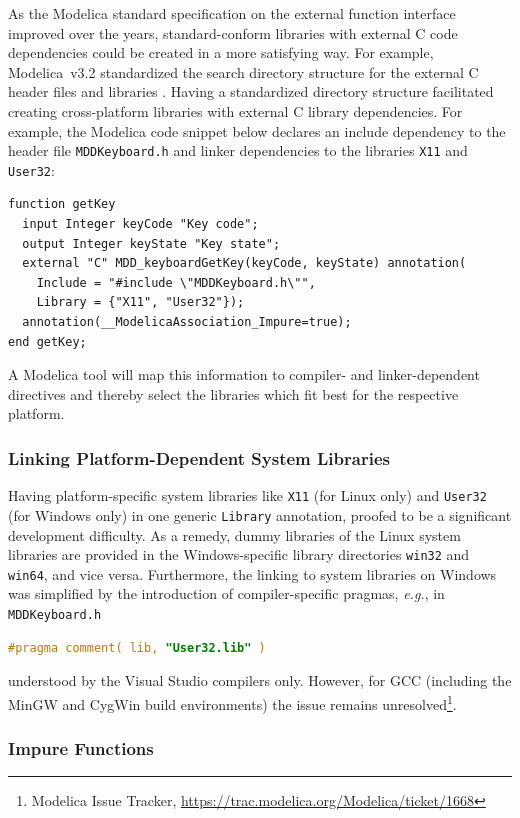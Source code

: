 \documentclass{resources/modelica}
\newcommand{\modelica}[1]{\lstinline[language=modelica]|#1|}
\begin{document}
As the Modelica standard specification on the external function interface improved over the years,
standard-conform libraries with external C code dependencies could
be created in a more satisfying way. For example, Modelica~v3.2
standardized the search directory structure for the external C header files and
libraries \citep[p.\@~153]{ModelicaAssociation2010}.
Having a standardized directory structure facilitated creating cross-platform libraries with external C library
dependencies. For example, the Modelica code snippet below declares an
include dependency to the header file \modelica{MDDKeyboard.h} and linker dependencies to the libraries
\modelica{X11} and \modelica{User32}:
\begin{lstlisting}[language=modelica]
function getKey
  input Integer keyCode "Key code";
  output Integer keyState "Key state";
  external "C" MDD_keyboardGetKey(keyCode, keyState) annotation(
    Include = "#include \"MDDKeyboard.h\"",
    Library = {"X11", "User32"});
  annotation(__ModelicaAssociation_Impure=true);
end getKey;
\end{lstlisting}
A Modelica tool will map this information to compiler- and linker-dependent
directives and thereby select the libraries which fit best for the respective
platform.

\subsubsection{Linking Platform-Dependent System Libraries}

Having platform-specific system libraries like \modelica{X11} (for Linux only) and \modelica{User32} (for Windows only) in one generic \modelica{Library} annotation, proofed to be a significant development difficulty. As a remedy, dummy libraries of the Linux system libraries are provided in the Windows-specific library directories \modelica{win32} and \modelica{win64}, and vice versa. Furthermore, the linking to system libraries on Windows was simplified by the introduction of compiler-specific pragmas, \textit{e.g.}, in \modelica{MDDKeyboard.h}
\begin{lstlisting}[language=C]
#pragma comment( lib, "User32.lib" )
\end{lstlisting}
understood by the Visual Studio compilers only. However, for GCC (including the MinGW and CygWin build environments) the issue remains unresolved\footnote{\label{T1668}Modelica Issue Tracker, \url{https://trac.modelica.org/Modelica/ticket/1668}}.

\subsubsection{Impure Functions}
\end{document}
